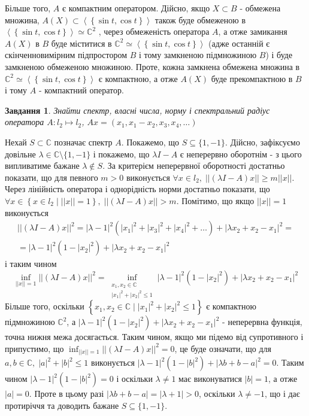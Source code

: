 \documentclass[12pt]{article} %
\newcommand{\mynorm}[1]{\left|\left|#1\right|\right|}
\newcommand{\myabs}[1]{\left|#1\right|}
\newcommand{\mysetn}[2]{\left\{#1\mid #2\right\}}
\newtheorem{prob}{Завдання}
\begin{document}
	Більше того, $A$ є компактним оператором. Дійсно, якщо $X\subset B$ - обмежена множина, $A(X)\subset
	\left<\left\{\sin t,\cos t\right\}\right>$ також буде обмеженою в $\left<\left\{\sin t,\cos t\right\}\right>\simeq \mathbb{C}^2$
	, через обмеженість оператора $A$, а отже замикання $A(X)$ в $B$ буде міститися в $\mathbb{C}^2\simeq
	\left<\left\{\sin t,\cos t\right\}\right>$
	(адже останній є скінченновимірним підпростором $B$ і тому замкненою підмножиною $B$) і буде замкненою обмеженою множиною. Проте, 
	кожна замкнена обмежена множина в $\mathbb{C}^2\simeq
	\left<\left\{\sin t,\cos t\right\}\right>$ є компактною, а отже $A(X)$ буде прекомпактною в $B$ і тому $A$ - компактний оператор.
\begin{prob}Знайти спектр, власні числа, норму і спектральний радіус оператора $A:l_2\mapsto l_2$, $Ax=(x_1,x_1-x_2,x_3,x_4,\dots)$\end{prob}
	Нехай $S\subset\mathbb{C}$ позначає спектр $A$. Покажемо, що $S\subseteq\{1,-1\}$. Дійсно, зафіксуємо довільне $\lambda\in\mathbb{C}\setminus
	\{1,-1\}$ і покажемо, що $\lambda I-A$ є неперервно оборотнім - з цього випливатиме бажане $\lambda\notin S$. За критерієм неперервної
	оборотності достатньо показати, що для певного $m>0$ виконується $\forall x\in l_2,\;\mynorm{(\lambda I-A)x}\geq m\mynorm{x}$. Через лінійність
	оператора і однорідність норми достатньо показати, що $\forall x\in\mysetn{x\in l_2}{\mynorm{x}=1},\;\mynorm{(\lambda I-A)x}>m$. Помітимо, що
	якщо $\mynorm{x}=1$ виконується
	\begin{gather*}
	\mynorm{(\lambda I-A)x}^2=\myabs{\lambda-1}^2(\myabs{x_1}^2+\myabs{x_3}^2+\myabs{x_4}^2+\dots)+\myabs{\lambda x_2+x_2-x_1}^2=\\
	=\myabs{\lambda-1}^2(1-\myabs{x_2}^2)+\myabs{\lambda x_2+x_2-x_1}^2
	\end{gather*}
	і таким чином
	\[\inf_{\mynorm{x}=1}\mynorm{(\lambda I-A)x}^2=\inf_{\substack{x_1,x_2\in\mathbb{C}\\\myabs{x_1}^2+\myabs{x_2}^2\leq 1}}
	\myabs{\lambda-1}^2(1-\myabs{x_2}^2)+\myabs{\lambda x_2+x_2-x_1}^2\]
	Більше того, оскільки $\mysetn{x_1,x_2\in\mathbb{C}}{\myabs{x_1}^2+\myabs{x_2}^2\leq 1}$ є компактною підмножиною $\mathbb{C}^2$, а
	$\myabs{\lambda-1}^2(1-\myabs{x_2}^2)+\myabs{\lambda x_2+x_2-x_1}^2$ - неперервна функція, точна нижня межа досягається. Таким чином,
	якщо ми підемо від супротивного і припустимо, що $\inf_{\mynorm{x}=1}\mynorm{(\lambda I-A)x}^2=0$, це буде означати, що для $a,b\in\mathbb{C}
	,\;\myabs{a}^2+\myabs{b}^2\leq 1$ виконується $\myabs{\lambda-1}^2(1-\myabs{b}^2)+\myabs{\lambda b+b-a}^2=0$. Таким чином
	$\myabs{\lambda-1}^2(1-\myabs{b}^2)=0$ і оскільки $\lambda\neq 1$ має виконуватися $\myabs{b}=1$, а отже $\myabs{a}=0$. Проте в цьому 
	разі	$\myabs{\lambda b+b-a}=\myabs{\lambda+1}>0$, оскільки $\lambda\neq -1$, що і дає протиріччя та доводить бажане $S\subseteq\{1,-1\}$.
\end{document}
